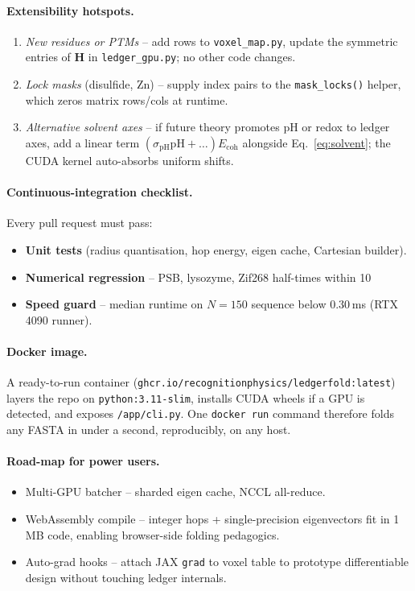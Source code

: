 \documentclass[11pt]{article}
\newcommand{\Eoh}{E_{\mathrm{coh}}}          %
\begin{document}
\paragraph{Extensibility hotspots.}

\begin{enumerate}\setlength\itemsep{2pt}
\item \emph{New residues or PTMs} – add rows to \texttt{voxel\_map.py},
      update the symmetric entries of \(\mathbf H\) in
      \texttt{ledger\_gpu.py}; no other code changes.
\item \emph{Lock masks} (disulfide, Zn) – supply index pairs to the
      \texttt{mask\_locks()} helper, which zeros matrix rows/cols at
      runtime.
\item \emph{Alternative solvent axes} – if future theory promotes pH or
      redox to ledger axes, add a linear term
      $(\sigma_{\mathrm{pH}}\mathrm{pH}+\dots)\Eoh$ alongside
      Eq.~\eqref{eq:solvent}; the CUDA kernel auto-absorbs uniform
      shifts.
\end{enumerate}

\paragraph{Continuous-integration checklist.}
Every pull request must pass:

\begin{itemize}\setlength\itemsep{2pt}
\item \textbf{Unit tests}  
      (radius quantisation, hop energy, eigen cache, Cartesian builder).
\item \textbf{Numerical regression}  
      – PSB, lysozyme, Zif268 half-times within 10 %
\item \textbf{Speed guard}  
      – median runtime on $N=150$ sequence below 0.30 ms (RTX 4090
      runner).
\end{itemize}

\paragraph{Docker image.}
A ready-to-run container
(\texttt{ghcr.io/recognitionphysics/ledgerfold:latest}) layers the repo
on \texttt{python:3.11-slim}, installs CUDA wheels if a GPU is detected,
and exposes \texttt{/app/cli.py}.  One \texttt{docker run} command
therefore folds any FASTA in under a second, reproducibly, on any host.

\paragraph{Road-map for power users.}
\begin{itemize}\setlength\itemsep{2pt}
\item Multi-GPU batcher – sharded eigen cache, NCCL all-reduce.
\item WebAssembly compile – integer hops + single-precision eigenvectors
      fit in 1 MB code, enabling browser-side folding pedagogics.
\item Auto-grad hooks – attach JAX \texttt{grad} to voxel table to
      prototype differentiable design without touching ledger internals.
\end{itemize}
\end{document}
